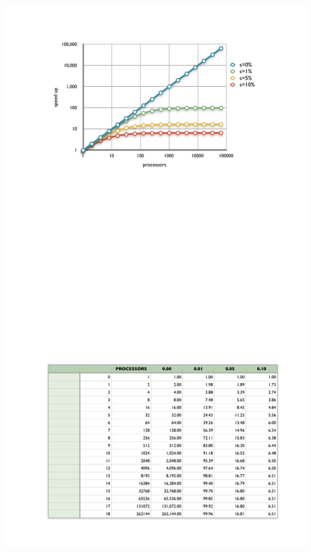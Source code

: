 \begin{frame}[fragile]
\begin{minipage}{.40\linewidth}
    \includegraphics[width=1.2\linewidth]{figures/amdahl.pdf}
  \end{minipage}
%
\end{frame}

